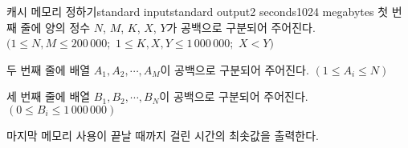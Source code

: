 \begin{problem}{캐시 메모리 정하기}{standard input}{standard output}{2 seconds}{1024 megabytes}
\InputFile
첫 번째 줄에 양의 정수 $N$, $M$, $K$, $X$, $Y$가 공백으로 구분되어 주어진다. $(1 \le N, M \le 200\,000;$ $1 \le K, X, Y \le 1\,000\,000;$ $X < Y)$

두 번째 줄에 배열 $A_1, A_2, \cdots, A_M$이 공백으로 구분되어 주어진다. $(1 \le A_i \le N)$

세 번째 줄에 배열 $B_1, B_2, \cdots, B_N$이 공백으로 구분되어 주어진다. $(0 \le B_i \le 1\,000\,000)$

\OutputFile
마지막 메모리 사용이 끝날 때까지 걸린 시간의 최솟값을 출력한다.

\Examples

\begin{example}
%
%
%
\end{example}

\end{problem}

